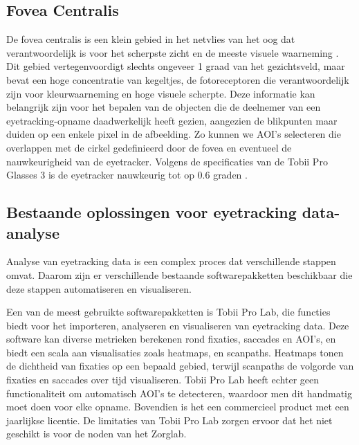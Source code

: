 \subsection{Fovea Centralis}
\label{sec:fovea-centralis}

De fovea centralis is een klein gebied in het netvlies van het oog dat verantwoordelijk is voor het 
scherpste zicht en de meeste visuele waarneming \autocite{Remington2012}.
Dit gebied vertegenvoordigt slechts ongeveer 1 graad van het gezichtsveld, maar bevat een hoge concentratie van kegeltjes, 
de fotoreceptoren die verantwoordelijk zijn voor kleurwaarneming en hoge visuele scherpte.
Deze informatie kan belangrijk zijn voor het bepalen van de objecten die de deelnemer van een eyetracking-opname daadwerkelijk heeft gezien,
aangezien de blikpunten maar duiden op een enkele pixel in de afbeelding. 
Zo kunnen we AOI's selecteren die overlappen met de cirkel gedefinieerd door de fovea en eventueel de nauwkeurigheid van de eyetracker.
Volgens de specificaties van de Tobii Pro Glasses 3 is de eyetracker nauwkeurig tot op 0.6 graden \autocite{Tobii2025a}.

\subsection{Bestaande oplossingen voor eyetracking data-analyse}

Analyse van eyetracking data is een complex proces dat verschillende stappen omvat. Daarom zijn er verschillende bestaande softwarepakketten beschikbaar die deze stappen automatiseren en visualiseren.

Een van de meest gebruikte softwarepakketten is Tobii Pro Lab, die functies biedt voor het importeren, analyseren en visualiseren van eyetracking data.
Deze software kan diverse metrieken \autocite{Tobii2025b} berekenen rond fixaties, 
saccades en AOI's, en biedt een scala aan visualisaties \autocite{Tobii2025c} zoals heatmaps, en scanpaths.
Heatmaps tonen de dichtheid van fixaties op een bepaald gebied, terwijl scanpaths de volgorde van fixaties en saccades over tijd visualiseren.
Tobii Pro Lab heeft echter geen functionaliteit om automatisch AOI's te detecteren, waardoor men dit handmatig moet doen voor elke opname.
Bovendien is het een commercieel product met een jaarlijkse licentie.
De limitaties van Tobii Pro Lab zorgen ervoor dat het niet geschikt is voor de noden van het Zorglab.

